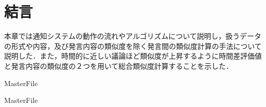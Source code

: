 \section{結言}
\label{model:conclusion}
本章では通知システムの動作の流れやアルゴリズムについて説明し，扱うデータの形式や内容，及び発言内容の類似度を除く発言間の類似度計算の手法について説明した．また，時間的に近しい議論ほど類似度が上昇するように時間差評価値と発言内容の類似度の２つを用いて総合類似度計算することを示した．

 \expandafter\ifx\csname MasterFile\endcsname\relax
	\def\BibFile{hoge}
	
  \fi
  \expandafter\ifx\csname MasterFile\endcsname\relax
  
  \fi
